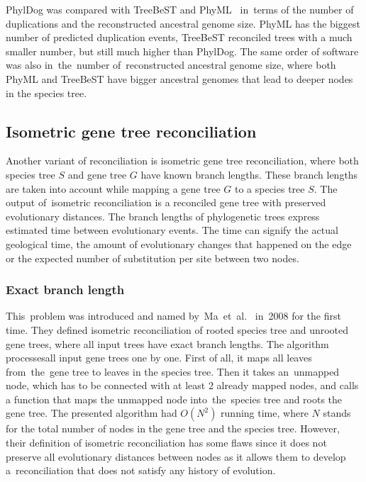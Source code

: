 PhylDog was compared with TreeBeST and PhyML~\cite{phyldog} in~terms of the number of duplications and the reconstructed ancestral genome size. PhyML has the biggest number of predicted duplication events, TreeBeST reconciled trees with a much smaller number, but still much higher than PhylDog. The same order of software was also in~the~number of~reconstructed ancestral genome size, where both PhyML and TreeBeST have bigger ancestral genomes that lead to deeper nodes in the species tree.

\subsection{Isometric gene tree reconciliation}
Another variant of reconciliation is isometric gene tree reconciliation, where both species tree $S$ and gene tree $G$ have known branch lengths. These branch lengths are taken into account while mapping a gene tree $G$ to a species tree $S$. The output of~isometric reconciliation is a reconciled gene tree with preserved evolutionary distances. The branch lengths of phylogenetic trees express estimated time between evolutionary events. The time can signify the actual geological time, the amount of evolutionary changes that happened on the edge or the expected number of substitution per site between two nodes.

\subsubsection{Exact branch length}

This~problem was introduced and named by~Ma~et~al.~\cite{ma} in~2008 for the first time. They defined isometric reconciliation of rooted species tree and unrooted gene trees, where all input trees have exact branch lengths. The algorithm processesall input gene trees one by one. First of all, it maps all leaves from~the~gene tree to leaves in the species tree. Then it takes an~unmapped node, which has to be connected with at least 2 already mapped nodes, and calls a function that maps the unmapped node into~the~species tree and roots the gene tree. The presented algorithm had $O(N^2)$ running time, where $N$ stands for the total number of nodes in the gene tree and the species tree. However, their definition of isometric reconciliation has some flaws since it does not preserve all evolutionary distances between nodes as it allows them to develop a~reconciliation that does not satisfy any history of evolution.

